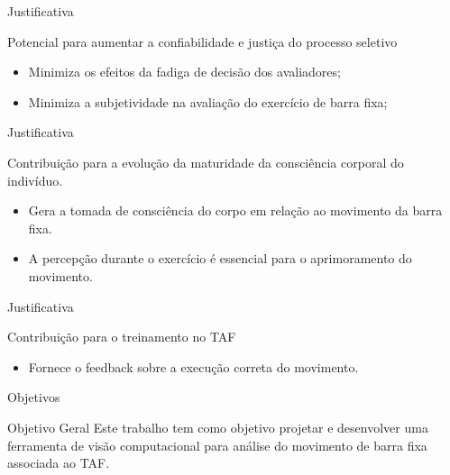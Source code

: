 

\begin{frame}{Justificativa}
    \begin{block}{ Potencial para aumentar a confiabilidade e justiça do processo seletivo}
        \begin{itemize}
            \item  Minimiza os efeitos da fadiga de decisão dos avaliadores;
            \item  Minimiza a subjetividade na avaliação do exercício de barra fixa;
        \end{itemize}
    \end{block}
\end{frame}


\begin{frame}{Justificativa}
    \begin{block}{Contribuição para a evolução da maturidade da consciência corporal do indivíduo.}
        \begin{itemize}
            \item Gera a tomada de consciência do corpo em relação ao movimento da barra fixa.
            \item A percepção durante o exercício é essencial para o aprimoramento do movimento.
        \end{itemize}
    \end{block}
\end{frame}


\begin{frame}{Justificativa}
    \begin{block}{Contribuição para o treinamento no TAF}
        \begin{itemize}
            \item Fornece o feedback sobre a execução correta do movimento.
        \end{itemize}
    \end{block}
\end{frame}





\begin{frame}{Objetivos}
    \begin{block}{Objetivo Geral}
    Este trabalho tem como objetivo projetar e desenvolver uma ferramenta de visão computacional para análise do movimento de barra fixa associada ao TAF.
    \end{block}

\end{frame}



